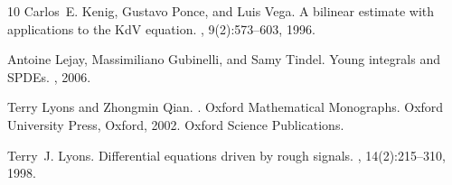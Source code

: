 \documentclass[a4paper,11pt,reqno]{article}
\begin{document}
\begin{thebibliography}{10}
Carlos~E. Kenig, Gustavo Ponce, and Luis Vega.
\newblock A bilinear estimate with applications to the {K}d{V} equation.
, 9(2):573--603, 1996.

Antoine Lejay, Massimiliano Gubinelli, and Samy Tindel.
\newblock Young integrals and {SPDE}s.
, 2006.

Terry Lyons and Zhongmin Qian.
.
\newblock Oxford Mathematical Monographs. Oxford University Press, Oxford,
  2002.
\newblock Oxford Science Publications.

Terry~J. Lyons.
\newblock Differential equations driven by rough signals.
, 14(2):215--310, 1998.

\end{thebibliography}
\end{document}
